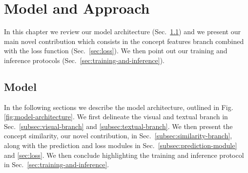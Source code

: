 
\chapter{Model and Approach}
\label{ch:model}

In this chapter we review our model architecture
(Sec.~\ref{sec:model}) and we present our main novel contribution
which consists in the concept features branch combined with the loss
function (Sec.~\ref{sec:loss}). We then point out our training and
inference protocols (Sec.~\ref{sec:training-and-inference}).

\section{Model}
\label{sec:model}

In the following sections we describe the model architecture, outlined
in Fig.\ref{fig:model-architecture}. We first delineate the visual and
textual branch in Sec.~\ref{subsec:visual-branch} and
\ref{subsec:textual-branch}. We then present the concept similarity,
our novel contribution, in Sec.~\ref{subsec:similarity-branch}, along
with the prediction and loss modules in
Sec.~\ref{subsec:prediction-module} and \ref{sec:loss}. We then
conclude highlighting the training and inference protocol in
Sec.~\ref{sec:training-and-inference}.

